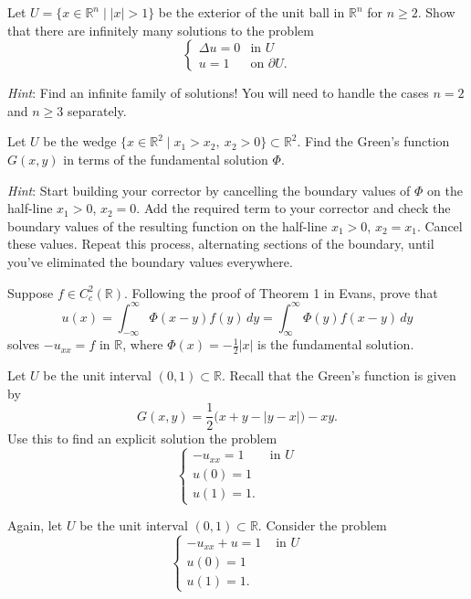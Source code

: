 \documentclass[12pt,fleqn]{exam}
\newcommand{\R}{\ensuremath{\mathbb{R}}}
\begin{document}
\begin{questions}

\question Let $U = \{x \in \R^n \mid |x| > 1\}$ be the exterior of the unit ball in $\R^n$ for $n \geq 2$. Show that there are infinitely many solutions to the problem
\[\begin{cases}
\Delta u = 0 & \text{in } U \\
u = 1 & \text{on } \partial U .
\end{cases}\]

\emph{Hint}: Find an infinite family of solutions! You will need to handle the cases $n = 2$ and $n \geq 3$ separately.

\question Let $U$ be the wedge $\{x \in \mathbb{R}^2 \mid x_1 > x_2,\ x_2 > 0\} \subset \R^2$. Find the Green's function $G(x,y)$ in terms of the fundamental solution $\Phi$.

\vspace{1ex}\emph{Hint}: Start building your corrector by cancelling the boundary values of $\Phi$ on the half-line $x_1 > 0$, $x_2 = 0$. Add the required term to your corrector and check the boundary values of the resulting function on the half-line $x_1 > 0$, $x_2 = x_1$. Cancel these values. Repeat this process, alternating sections of the boundary, until you've eliminated the boundary values everywhere.

\question Suppose $f \in C^2_c(\R)$. Following the proof of Theorem 1 in Evans, prove that
\[u(x) = \int_{-\infty}^{\infty} \Phi(x-y) f(y)\,dy = \int_{\infty}^{\infty} \Phi(y) f(x-y)\,dy\]
solves $-u_{xx} = f$ in $\R$, where $\Phi(x) = -\frac12 |x|$ is the fundamental solution.

\question Let $U$ be the unit interval $(0,1) \subset \R$. Recall that the Green's function is given by
\[G(x,y) = \frac12 \big(x+y-|y-x|\big) - xy.\]
Use this to find an explicit solution the problem
\[
\begin{cases}
-u_{xx} = 1 & \text{ in $U$} \\
u(0) = 1 \\
u(1) = 1.
\end{cases}
\]

\question Again, let $U$ be the unit interval $(0,1) \subset \R$. Consider the problem
\[
\begin{cases}
-u_{xx} + u = 1 & \text{ in $U$} \\
u(0) = 1 \\
u(1) = 1.
\end{cases}
\]

\begin{parts}

\end{parts}
\end{questions}
\end{document}
